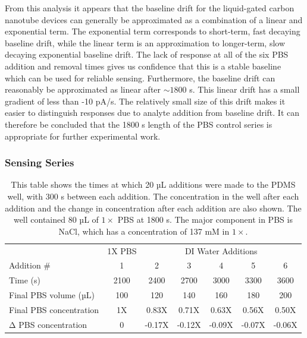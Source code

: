 \documentclass[
  letterpaper,
  DIV=11,
  numbers=noendperiod]{scrartcl}
\begin{document}
From this analysis it appears that the baseline drift for the
liquid-gated carbon nanotube devices can generally be approximated as a
combination of a linear and exponential term. The exponential term
corresponds to short-term, fast decaying baseline drift, while the
linear term is an approximation to longer-term, slow decaying
exponential baseline drift. The lack of response at all of the six PBS
addition and removal times gives us confidence that this is a stable
baseline which can be used for reliable sensing. Furthermore, the
baseline drift can reasonably be approximated as linear after
\(\sim 1800\) s. This linear drift has a small gradient of less than -10
pA/s. The relatively small size of this drift makes it easier to
distinguish responses due to analyte addition from baseline drift. It
can therefore be concluded that the 1800 s length of the PBS control
series is appropriate for further experimental work.

\hypertarget{sec-salt-conc-series}{%
\subsubsection{Sensing Series}\label{sec-salt-conc-series}}

\hypertarget{tbl-salt-conc-series}{}
\begin{longtable}[t]{lcccccc}
\caption{\label{tbl-salt-conc-series}This table shows the times at which 20 µL additions were made to the
PDMS well, with 300 s between each addition. The concentration in the
well after each addition and the change in concentration after each
addition are also shown. The well contained 80 µL of \(1 \times\) PBS at
1800 s. The major component in PBS is NaCl, which has a concentration of
137 mM in \(1 \times\). }\tabularnewline

\toprule
\multicolumn{1}{c}{ } & \multicolumn{1}{c}{1X PBS} & \multicolumn{5}{c}{DI Water Additions} \\
\cmidrule(l{3pt}r{3pt}){2-2} \cmidrule(l{3pt}r{3pt}){3-7}
Addition \# & 1 & 2 & 3 & 4 & 5 & 6\\
\midrule
Time (s) & 2100 & 2400 & 2700 & 3000 & 3300 & 3600\\
Final PBS volume (µL) & 100 & 120 & 140 & 160 & 180 & 200\\
Final PBS concentration & 1X & 0.83X & 0.71X & 0.63X & 0.56X & 0.50X\\
Δ PBS concentration & 0 & -0.17X & -0.12X & -0.09X & -0.07X & -0.06X\\
\bottomrule
\end{longtable}
\end{document}

